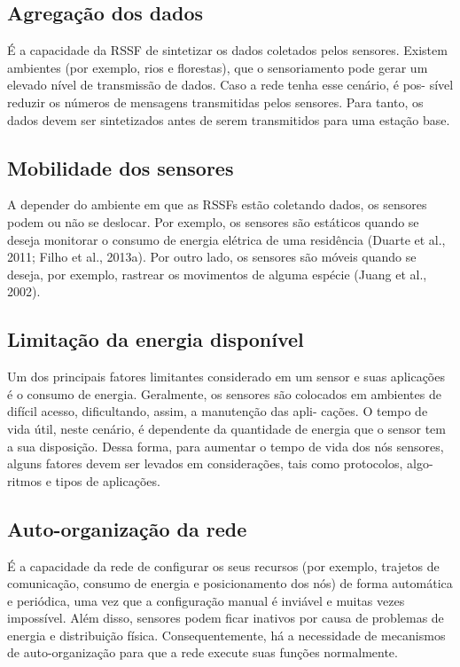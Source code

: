 	
	\subsection{Agregação dos dados} 
	É a capacidade da RSSF de sintetizar os dados coletados pelos sensores. Existem ambientes (por exemplo, rios e florestas), que o sensoriamento pode gerar um elevado nível de transmissão de dados. Caso a rede tenha esse cenário, é pos- sível reduzir os números de mensagens transmitidas pelos sensores. Para tanto, os dados devem ser sintetizados antes de serem transmitidos para uma estação base.
	
	\subsection{Mobilidade dos sensores} 
	A depender do ambiente em que as RSSFs estão coletando dados, os sensores podem ou não se deslocar. Por exemplo, os sensores são estáticos quando se deseja monitorar o consumo de energia elétrica de uma residência (Duarte et al., 2011; Filho et al., 2013a). Por outro lado, os sensores são móveis quando se deseja, por exemplo, rastrear os movimentos de alguma espécie (Juang et al., 2002).
	
	\subsection{Limitação da energia disponível} 
	Um dos principais fatores limitantes considerado em um sensor e suas aplicações é o consumo de energia. Geralmente, os sensores são colocados em ambientes de difícil acesso, dificultando, assim, a manutenção das apli- cações. O tempo de vida útil, neste cenário, é dependente da quantidade de energia que o sensor tem a sua disposição. Dessa forma, para aumentar o tempo de vida dos nós sensores, alguns fatores devem ser levados em considerações, tais como protocolos, algo-
ritmos e tipos de aplicações.
	
	\subsection{Auto-organização da rede} 
	É a capacidade da rede de configurar os seus recursos
(por exemplo, trajetos de comunicação, consumo de energia e posicionamento dos nós) de forma automática e periódica, uma vez que a configuração manual é inviável e muitas vezes impossível. Além disso, sensores podem ficar inativos por causa de problemas de energia e distribuição física. Consequentemente, há a necessidade de mecanismos de auto-organização para que a rede execute suas funções normalmente.
	
